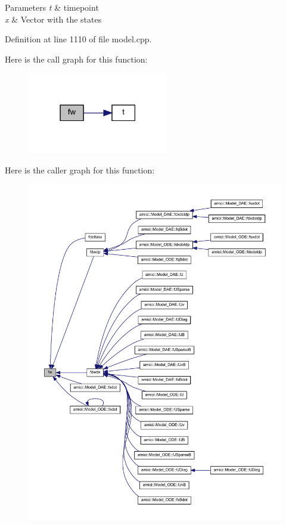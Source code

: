\begin{DoxyParams}{Parameters}
{\em t} & timepoint \\
\hline
{\em x} & Vector with the states \\
\hline
\end{DoxyParams}


Definition at line 1110 of file model.\+cpp.

Here is the call graph for this function\+:
\nopagebreak
\begin{figure}[H]
\begin{center}
\leavevmode
\includegraphics[width=174pt]{classamici_1_1_model_aa8570e0334110a30e2e459efa53df9be_cgraph}
\end{center}
\end{figure}
Here is the caller graph for this function\+:
\nopagebreak
\begin{figure}[H]
\begin{center}
\leavevmode
\includegraphics[width=350pt]{classamici_1_1_model_aa8570e0334110a30e2e459efa53df9be_icgraph}
\end{center}
\end{figure}
\mbox{\label{classamici_1_1_model_abccb9631015d7f75c8afc249c9dbd002}} 
